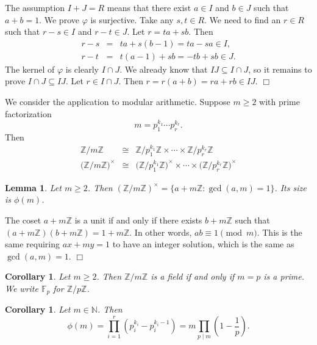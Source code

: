 \documentclass{article}
\def\Z{{\mathbb Z}}
\def\F{{\mathbb F}}
\def\N{{\mathbb N}}
\def\Z{{\mathbb Z}}
\def\F{{\mathbb F}}
\newtheorem{cor}[subsection]{Corollary}
\newtheorem{lemma}[subsection]{Lemma}
\newenvironment{proof}{\noindent {\bf Proof:}}{$\Box$ \vspace{2 ex}}
\begin{document}
\vspace{5pt}
\begin{proof}
    The assumption $I + J = R$ means that there exist $a\in I$ and $b\in J$ such that $a + b = 1$. We prove $\varphi$ is surjective. Take any $s,t\in R$. We need to find an $r\in R$ such that $r - s\in I$ and $r - t\in J$. Let $r = ta + sb$. Then 
    \begin{eqnarray*}
        r - s &=& ta + s(b - 1) = ta - sa\in I,\\
        r - t &=& t(a - 1) + sb = -tb + sb \in J.
    \end{eqnarray*}
    The kernel of $\varphi$ is clearly $I\cap J$. We already know that $IJ\subseteq I\cap J$, so it remains to prove $I\cap J \subseteq IJ$. Let $r\in I\cap J$. Then $r = r(a + b) = ra + rb \in IJ$. 
\end{proof}

We consider the application to modular arithmetic. Suppose $m\geq2$ with prime factorization $$m = p_1^{k_1}\cdots p_r^{k_r}.$$
Then
\begin{eqnarray*}
    \Z/m\Z &\cong& \Z/p_1^{k_1}\Z\times\cdots\times\Z/p_r^{k_r}\Z\\
    \Big(\Z/m\Z\Big)^\times &\cong& \Big(\Z/p_1^{k_1}\Z\Big)^\times\times\cdots\times\Big(\Z/p_r^{k_r}\Z\Big)^\times
\end{eqnarray*}


\begin{lemma}
    Let $m\geq2$. Then $(\Z/m\Z)^\times = \{a + m\Z\colon \gcd(a,m) = 1\}$. Its size is $\phi(m)$.
\end{lemma}

\begin{proof}
    The coset $a + m\Z$ is a unit if and only if there exists $b + m\Z$ such that $(a+m\Z)(b+m\Z) = 1+m\Z$. In other words, $ab\equiv 1\pmod{m}$. This is the same requiring $ax + my = 1$ to have an integer solution, which is the same as $\gcd(a,m) = 1$.
\end{proof}

\begin{cor}
    Let $m\geq2$. Then $\Z/m\Z$ is a field if and only if $m = p$ is a prime. We write $\F_p$ for $\Z/p\Z$.
\end{cor}

\begin{cor}
    Let $m\in\N$. Then $$\displaystyle\phi(m) = \prod_{i=1}^r\left(p_i^{k_i}-p_i^{k_i-1}\right)=m\prod_{p\mid m}\left(1-\frac{1}{p}\right).$$
\end{cor}
\end{document}
